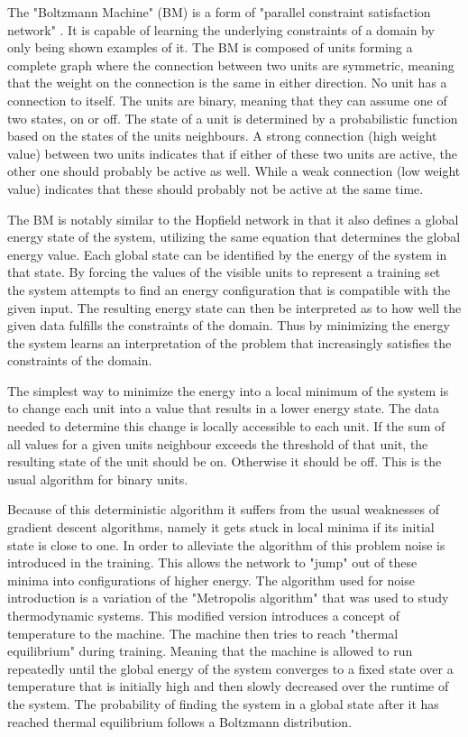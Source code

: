\documentclass[12pt, a4paper]{article}
\begin{document}
The "Boltzmann Machine" (BM) is a form of "parallel constraint satisfaction network" \cite{ackley1985learning}. It is capable of learning the underlying constraints of a domain by only being shown examples of it. The BM is composed of units forming a complete graph where the connection between two units are symmetric, meaning that the weight on the connection is the same in either direction. No unit has a connection to itself. The units are binary, meaning that they can assume one of two states, on or off. The state of a unit is determined by a probabilistic function based on the states of the units neighbours. A strong connection (high weight value) between two units indicates that if either of these two units are active, the other one should probably be active as well. While a weak connection (low weight value) indicates that these should probably not be active at the same time.

The BM is notably similar to the Hopfield network in that it also defines a global energy state of the system, utilizing the same equation that determines the global energy value. Each global state can be identified by the energy of the system in that state. By forcing the values of the visible units to represent a training set the system attempts to find an energy configuration that is compatible with the given input. The resulting energy state can then be interpreted as to how well the given data fulfills the constraints of the domain. Thus by minimizing the energy the system learns an interpretation of the problem that increasingly satisfies the constraints of the domain.

The simplest way to minimize the energy into a local minimum of the system is to change each unit into a value that results in a lower energy state. The data needed to determine this change is locally accessible to each unit. If the sum of all values for a given units neighbour exceeds the threshold of that unit, the resulting state of the unit should be on. Otherwise it should be off. This is the usual algorithm for binary units.

Because of this deterministic algorithm it suffers from the usual weaknesses of gradient descent algorithms, namely it gets stuck in local minima if its initial state is close to one. In order to alleviate the algorithm of this problem noise is introduced in the training. This allows the network to "jump" out of these minima into configurations of higher energy. The algorithm used for noise introduction is a variation of the "Metropolis algorithm" \cite{metropolis1953equation} that was used to study thermodynamic systems. This modified version introduces a concept of temperature to the machine. The machine then tries to reach "thermal equilibrium" during training. Meaning that the machine is allowed to run repeatedly until the global energy of the system converges to a fixed state over a temperature that is initially high and then slowly decreased over the runtime of the system. The probability of finding the system in a global state after it has reached thermal equilibrium follows a Boltzmann distribution.
\end{document}
